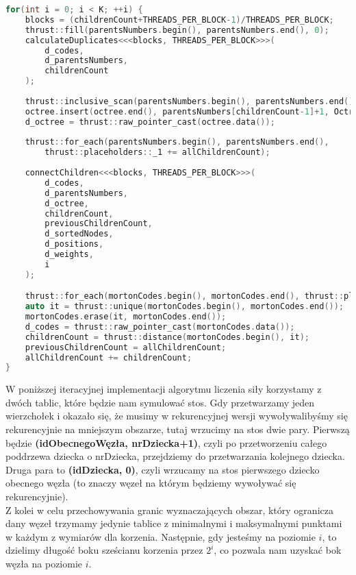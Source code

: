 \documentclass[14pt,twoside,a4paper]{article}
\theoremstyle{definition}
\begin{document}
\begin{lstlisting}[language=C++, frame=single, framerule=2pt, caption=Kroki 5-6]
for(int i = 0; i < K; ++i) {
    blocks = (childrenCount+THREADS_PER_BLOCK-1)/THREADS_PER_BLOCK;
    thrust::fill(parentsNumbers.begin(), parentsNumbers.end(), 0);
    calculateDuplicates<<<blocks, THREADS_PER_BLOCK>>>(
        d_codes,
        d_parentsNumbers,
        childrenCount
    );
        
    thrust::inclusive_scan(parentsNumbers.begin(), parentsNumbers.end(), parentsNumbers.begin());
    octree.insert(octree.end(), parentsNumbers[childrenCount-1]+1, OctreeNode());
    d_octree = thrust::raw_pointer_cast(octree.data());
        
    thrust::for_each(parentsNumbers.begin(), parentsNumbers.end(),
    	thrust::placeholders::_1 += allChildrenCount);
        
    connectChildren<<<blocks, THREADS_PER_BLOCK>>>(
        d_codes,
        d_parentsNumbers,
        d_octree,
        childrenCount,
        previousChildrenCount,
        d_sortedNodes,
        d_positions,
        d_weights,
        i
    );

    thrust::for_each(mortonCodes.begin(), mortonCodes.end(), thrust::placeholders::_1 >>= 3);        
    auto it = thrust::unique(mortonCodes.begin(), mortonCodes.end());
    mortonCodes.erase(it, mortonCodes.end());
    d_codes = thrust::raw_pointer_cast(mortonCodes.data()); 
    childrenCount = thrust::distance(mortonCodes.begin(), it);
    previousChildrenCount = allChildrenCount;
    allChildrenCount += childrenCount;
}
\end{lstlisting}
\bigskip
W poniższej iteracyjnej implementacji algorytmu liczenia siły korzystamy z dwóch tablic, które będzie nam symulować stos. Gdy przetwarzamy jeden wierzchołek i okazało się, że musimy w rekurencyjnej wersji wywoływalibyśmy się rekurencyjnie na mniejszym obszarze, tutaj wrzucimy na stos dwie pary. Pierwszą będzie \textbf{(idObecnegoWęzła, nrDziecka+1)}, czyli po przetworzeniu całego poddrzewa dziecka o  nrDziecka, przejdziemy do przetwarzania kolejnego dziecka. Druga para to \textbf{(idDziecka, 0)}, czyli wrzucamy na stos pierwszego dziecko obecnego węzła (to znaczy węzeł na którym będziemy wywoływać się rekurencyjnie).\\ Z kolei w celu przechowywania granic wyznaczających obszar, który ogranicza dany węzeł trzymamy jedynie tablice z minimalnymi i maksymalnymi punktami w każdym z wymiarów dla korzenia. Następnie, gdy jesteśmy na poziomie $i$, to dzielimy długość boku sześcianu korzenia przez $2^{i}$, co pozwala nam uzyskać bok węzła na poziomie $i$.
\end{document}

